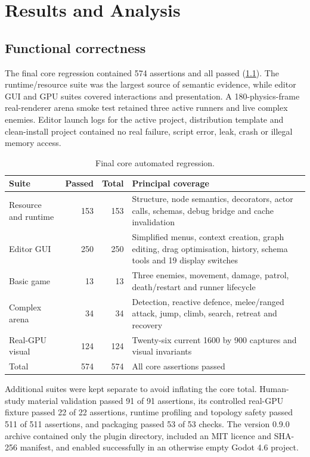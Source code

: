 \chapter{Results and Analysis}
\label{ch:results}

\section{Functional correctness}

The final core regression contained 574 assertions and all passed (\cref{tab:coretests}). The runtime/resource suite was the largest source of semantic evidence, while editor GUI and GPU suites covered interactions and presentation. A 180-physics-frame real-renderer arena smoke test retained three active runners and live complex enemies. Editor launch logs for the active project, distribution template and clean-install project contained no real failure, script error, leak, crash or illegal memory access.

\begin{table}[htbp]
\centering
\caption{Final core automated regression.}
\label{tab:coretests}
\begin{tabular}{lrrp{}}
\toprule
Suite & Passed & Total & Principal coverage \\
\midrule
Resource and runtime & 153 & 153 & Structure, node semantics, decorators, actor calls, schemas, debug bridge and cache invalidation \\
Editor GUI & 250 & 250 & Simplified menus, context creation, graph editing, drag optimisation, history, schema tools and 19 display switches \\
Basic game & 13 & 13 & Three enemies, movement, damage, patrol, death/restart and runner lifecycle \\
Complex arena & 34 & 34 & Detection, reactive defence, melee/ranged attack, jump, climb, search, retreat and recovery \\
Real-GPU visual & 124 & 124 & Twenty-six current 1600 by 900 captures and visual invariants \\
\midrule
Total & 574 & 574 & All core assertions passed \\
\bottomrule
\end{tabular}
\end{table}

Additional suites were kept separate to avoid inflating the core total. Human-study material validation passed 91 of 91 assertions, its controlled real-\ac{GPU} fixture passed 22 of 22 assertions, runtime profiling and topology safety passed 511 of 511 assertions, and packaging passed 53 of 53 checks. The version 0.9.0 archive contained only the plugin directory, included an MIT licence and SHA-256 manifest, and enabled successfully in an otherwise empty Godot 4.6 project.

